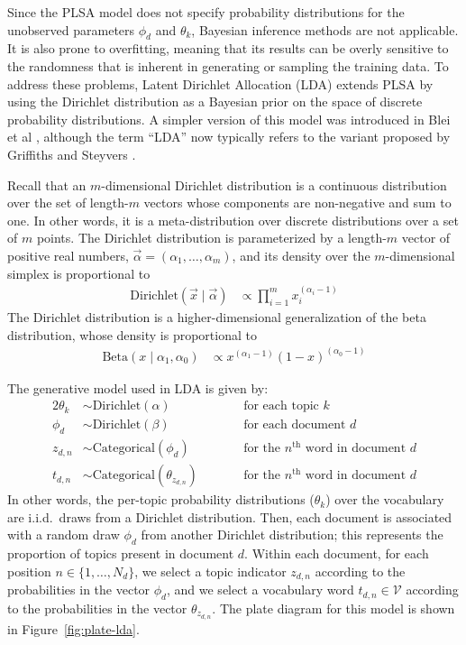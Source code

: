 \documentclass{article}
\newcommand{\nth}{^{\text{th}}}
\begin{document}
Since the PLSA model does not specify probability distributions for the unobserved parameters $\phi_d$ and $\theta_k$, Bayesian inference methods are not applicable.
It is also prone to overfitting, meaning that its results can be overly sensitive to the randomness that is inherent in generating or sampling the training data.
To address these problems, Latent Dirichlet Allocation (LDA) extends PLSA by using the Dirichlet distribution as a Bayesian prior on the space of discrete probability distributions.
A simpler version of this model was introduced in Blei et al \cite{blei2003lda}, although the term ``LDA'' now typically refers to the variant proposed by Griffiths and Steyvers \cite{griffiths2004lda}.

Recall that an $m$-dimensional Dirichlet distribution is a continuous distribution over the set of length-$m$ vectors whose components are non-negative and sum to one.
In other words, it is a meta-distribution over discrete distributions over a set of $m$ points.
The Dirichlet distribution is parameterized by a length-$m$ vector of positive real numbers, $\vec \alpha = (\alpha_1, \ldots, \alpha_m)$, and its density over the $m$-dimensional simplex is proportional to
\begin{align}
\text{Dirichlet}(\vec x \mid \vec \alpha) &\propto \prod_{i=1}^m x_i^{(\alpha_i-1)}
\end{align}
The Dirichlet distribution is a higher-dimensional generalization of the beta distribution, whose density is proportional to
\begin{align}
\text{Beta}(x \mid \alpha_1, \alpha_0) &\propto x^{(\alpha_1-1)} (1-x)^{(\alpha_0-1)}
\end{align}

The generative model used in LDA is given by:
\begin{alignat}{2}
\theta_k &\sim \text{Dirichlet}(\alpha) &\qquad&\text{for each topic $k$} \\
\phi_d &\sim \text{Dirichlet}(\beta) &\qquad&\text{for each document $d$} \\
z_{d,n} &\sim \text{Categorical}(\phi_d) &\qquad&\text{for the $n\nth$ word in document $d$} \\
t_{d,n} &\sim \text{Categorical}(\theta_{z_{d,n}}) &\qquad&\text{for the $n\nth$ word in document $d$}
\end{alignat}
In other words, the per-topic probability distributions ($\theta_k$) over the vocabulary are i.i.d.\ draws from a Dirichlet distribution.
Then, each document is associated with a random draw $\phi_d$ from another Dirichlet distribution; this represents the proportion of topics present in document $d$.
Within each document, for each position $n \in \{1, \ldots, N_d\}$, we select a topic indicator $z_{d,n}$ according to the probabilities in the vector $\phi_d$, and we select a vocabulary word $t_{d,n} \in \mathcal V$ according to the probabilities in the vector $\theta_{z_{d,n}}$.
The plate diagram for this model is shown in Figure~\ref{fig:plate-lda}.
\end{document}
